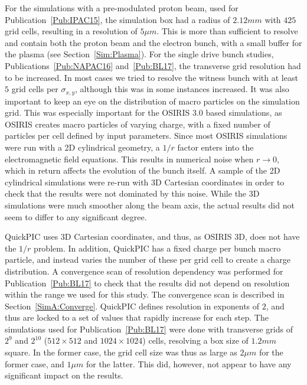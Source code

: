 For the simulations with a pre-modulated proton beam, used for Publication~\ref{Pub:IPAC15}, the simulation box had a radius of $2.12\unit{mm}$ with $425$ grid cells, resulting in a resolution of $5\unit{\mu m}$.
This is more than sufficient to resolve and contain both the proton beam and the electron bunch, with a small buffer for the plasma (see Section~\ref{Sim:Plasma}).
For the single drive bunch studies, Publications~\ref{Pub:NAPAC16} and~\ref{Pub:BL17}, the transverse grid resolution had to be increased.
In most cases we tried to resolve the witness bunch with at least $5$ grid cells per $\sigma_{x,y}$, although this was in some instances increased.
It was also important to keep an eye on the distribution of macro particles on the simulation grid.
This was especially important for the OSIRIS 3.0 based simulations, as OSIRIS creates macro particles of varying charge, with a fixed number of particles per cell defined by input parameters.
Since most OSIRIS simulations were run with a 2D cylindrical geometry, a $1/r$ factor enters into the electromagnetic field equations.
This results in numerical noise when $r \to 0$, which in return affects the evolution of the bunch itself.
A sample of the 2D cylindrical simulations were re-run with 3D Cartesian coordinates in order to check that the results were not dominated by this noise.
While the 3D simulations were much smoother along the beam axis, the actual results did not seem to differ to any significant degree.

QuickPIC uses 3D Cartesian coordinates, and thus, as OSIRIS 3D, does not have the $1/r$ problem.
In addition, QuickPIC has a fixed charge per bunch macro particle, and instead varies the number of these per grid cell to create a charge distribution.
A convergence scan of resolution dependency was performed for Publication~\ref{Pub:BL17} to check that the results did not depend on resolution within the range we used for this study. The convergence scan is described in Section~\ref{SimA:Converge}.
QuickPIC defines resolution in exponents of $2$, and thus are locked to a set of values that rapidly increase for each step.
The simulations used for Publication~\ref{Pub:BL17} were done with transverse grids of $2^{9}$ and $2^{10}$ ($512 \times 512$ and $1024 \times 1024$) cells, resolving a box size of $1.2\unit{mm}$ square.
In the former case, the grid cell size was thus as large as $2\unit{\mu m}$ for the former case, and $1\unit{\mu m}$ for the latter.
This did, however, not appear to have any significant impact on the results.

